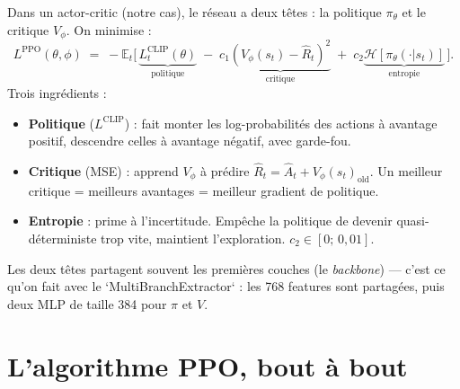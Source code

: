 \documentclass[a4paper,11pt]{article}
\theoremstyle{clean}
\newcommand{\E}{\mathbb{E}}
\newcommand{\piT}{\pi_{\theta}}
\begin{document}
Dans un actor-critic (notre cas), le réseau a deux têtes : la politique $\piT$ et le critique $V_\phi$. On minimise :
\[
L^{\mathrm{PPO}}(\theta,\phi) \;=\; -\E_t\!\Big[\, \underbrace{L^{\mathrm{CLIP}}_t(\theta)}_{\text{politique}} \;-\; c_1 \underbrace{(V_\phi(s_t) - \hat R_t)^2}_{\text{critique}} \;+\; c_2 \underbrace{\mathcal{H}[\piT(\cdot|s_t)]}_{\text{entropie}} \,\Big].
\]
Trois ingrédients :
\begin{itemize}[nosep,leftmargin=1.2em]
\item \textbf{Politique} ($L^{\mathrm{CLIP}}$) : fait monter les log-probabilités des actions à avantage positif, descendre celles à avantage négatif, avec garde-fou.
\item \textbf{Critique} (MSE) : apprend $V_\phi$ à prédire $\hat R_t = \hat A_t + V_\phi(s_t)_{\text{old}}$. Un meilleur critique = meilleurs avantages = meilleur gradient de politique.
\item \textbf{Entropie} : prime à l'incertitude. Empêche la politique de devenir quasi-déterministe trop vite, maintient l'exploration. $c_2 \in [0;\, 0{,}01]$.
\end{itemize}
Les deux têtes partagent souvent les premières couches (le \emph{backbone}) --- c'est ce qu'on fait avec le `MultiBranchExtractor` : les 768 features sont partagées, puis deux MLP de taille 384 pour $\pi$ et $V$.

\section{L'algorithme PPO, bout à bout}
\end{document}
